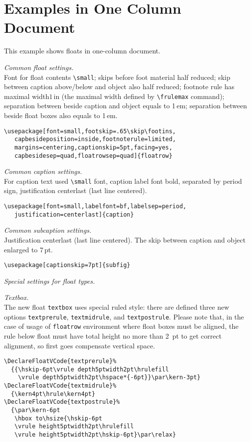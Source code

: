 \documentclass{book}
\providecommand*{\env}[1]{\texttt{#1}}
\begin{document}
\chapter{Examples in One Column Document}

\begin{sl}
This example shows floats in one-column document.

\emph{Common float settings.}\\
Font for float contents \verb|\small|; skips before foot material half reduced;
skip between caption above/below and object also half reduced;
footnote rule has maximal width$1$\,in (the maximal width defined by \verb|\frulemax| command); separation between
beside caption and object equals to 1\,em; separation between beside float
boxes also equals to 1\,em.
\begin{verbatim}
\usepackage[font=small,footskip=.65\skip\footins,
   capbesideposition=inside,footnoterule=limited,
   margins=centering,captionskip=5pt,facing=yes,
   capbesidesep=quad,floatrowsep=quad]{floatrow}
\end{verbatim}

\emph{Common caption settings.}\\
For caption text used \verb|\small| font, caption label font bold, separated
by period sign, justification centerlast (last line centered).
\begin{verbatim}
\usepackage[font=small,labelfont=bf,labelsep=period,
   justification=centerlast]{caption}
\end{verbatim}

\emph{Common subcaption settings.}\\
Justification centerlast (last line centered). The skip between caption and object enlarged to 7\,pt.
\begin{verbatim}
\usepackage[captionskip=7pt]{subfig}
\end{verbatim}

\emph{Special settings for float types.}

\emph{Textbox.}\\
The new float \env{textbox} uses special ruled style: there are defined three new options
\texttt{textprerule}, \texttt{textmidrule}, and \texttt{textpostrule}.
Please note that, in the case of usage of \env{floatrow} environment where float boxes must be aligned,
the rule below float must have total height no more than 2~pt to get correct alignment,
so first goes compensate vertical space.
\begin{verbatim}
\DeclareFloatVCode{textprerule}%
  {{\hskip-6pt\vrule depth5ptwidth2pt\hrulefill
    \vrule depth5ptwidth2pt\hspace*{-6pt}}\par\kern-3pt}
\DeclareFloatVCode{textmidrule}%
  {\kern4pt\hrule\kern4pt}
\DeclareFloatVCode{textpostrule}%
  {\par\kern-6pt
   \hbox to\hsize{\hskip-6pt
   \vrule height5ptwidth2pt\hrulefill
   \vrule height5ptwidth2pt\hskip-6pt}\par\relax}


\end{verbatim}
\end{sl}
\end{document}
